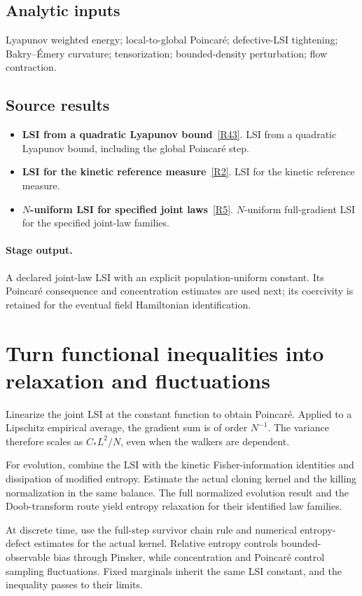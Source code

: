 \documentclass[11pt,a4paper]{article}
\begin{document}
\subsection*{Analytic inputs}
Lyapunov weighted energy; local-to-global Poincar\'e; defective-LSI tightening; Bakry--\'Emery curvature; tensorization; bounded-density perturbation; flow contraction.
\subsection*{Source results}
\begin{itemize}
\item \textbf{LSI from a quadratic Lyapunov bound}~\hyperref[src:thm-unconditional-lsi]{[R43]}. LSI from a quadratic Lyapunov bound, including the global Poincar\'e step.
\item \textbf{LSI for the kinetic reference measure}~\hyperref[src:thm-kinetic-lsi]{[R2]}. LSI for the kinetic reference measure.
\item \textbf{\(N\)-uniform LSI for specified joint laws}~\hyperref[src:cor-n-uniform-lsi]{[R5]}. \(N\)-uniform full-gradient LSI for the specified joint-law families.
\end{itemize}
\paragraph{Stage output.} A declared joint-law LSI with an explicit population-uniform constant. Its Poincar\'e consequence and concentration estimates are used next; its coercivity is retained for the eventual field Hamiltonian identification.

\section{Turn functional inequalities into relaxation and fluctuations}
\label{stage:8}
Linearize the joint LSI at the constant function to obtain Poincar\'e. Applied to a Lipschitz empirical average, the gradient sum is of order \(N^{-1}\). The variance therefore scales as \(C_*L^2/N\), even when the walkers are dependent.

For evolution, combine the LSI with the kinetic Fisher-information identities and dissipation of modified entropy. Estimate the actual cloning kernel and the killing normalization in the same balance. The full normalized evolution result and the Doob-transform route yield entropy relaxation for their identified law families.

At discrete time, use the full-step survivor chain rule and numerical entropy-defect estimates for the actual kernel. Relative entropy controls bounded-observable bias through Pinsker, while concentration and Poincar\'e control sampling fluctuations. Fixed marginals inherit the same LSI constant, and the inequality passes to their limits.
\end{document}
